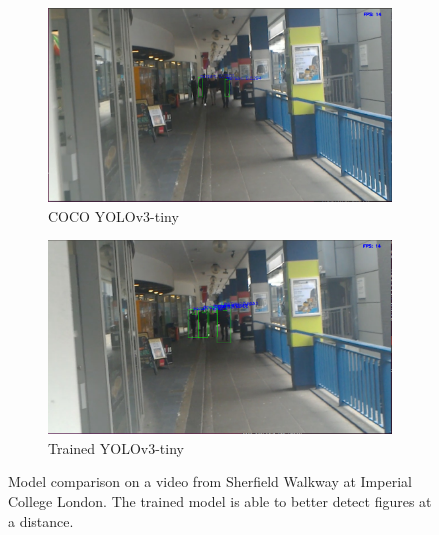 \begin{figure}[ht]
	\begin{subfigure}[b]{.5\textwidth}
		\centering
		\includegraphics[width=0.95\linewidth]{img/chapter4_analysis/yoloCoco.png}
		\caption{COCO YOLOv3-tiny}
	\end{subfigure}%
	\hspace{\fill} 
	\begin{subfigure}[b]{.5\textwidth}
		\centering
		\includegraphics[width=0.95\linewidth]{img/chapter4_analysis/yoloCH.png}
		\caption{Trained YOLOv3-tiny}
	\end{subfigure}
	\vspace{-2\baselineskip}
	\begin{center}
		\caption{Model comparison on a video from Sherfield Walkway at Imperial College London. The trained model is able to better detect figures at a distance.}
		\label{fig:yoloCHvsCoco}
	\end{center}
	\vspace{-2\baselineskip}
\end{figure}

